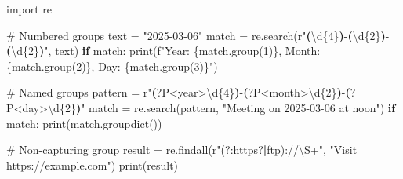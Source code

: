 \documentclass[
  english,
  letterpaper,
  DIV=11,
  numbers=noendperiod]{scrreprt}
\newenvironment{Shaded}{\begin{snugshade}}{\end{snugshade}}
\newcommand{\BuiltInTok}[1]{\textcolor[rgb]{0.00,0.23,0.31}{#1}}
\newcommand{\CommentTok}[1]{\textcolor[rgb]{0.37,0.37,0.37}{#1}}
\newcommand{\ControlFlowTok}[1]{\textcolor[rgb]{0.00,0.23,0.31}{\textbf{#1}}}
\newcommand{\DecValTok}[1]{\textcolor[rgb]{0.68,0.00,0.00}{#1}}
\newcommand{\FunctionTok}[1]{\textcolor[rgb]{0.28,0.35,0.67}{#1}}
\newcommand{\ImportTok}[1]{\textcolor[rgb]{0.00,0.46,0.62}{#1}}
\newcommand{\KeywordTok}[1]{\textcolor[rgb]{0.00,0.23,0.31}{\textbf{#1}}}
\newcommand{\NormalTok}[1]{\textcolor[rgb]{0.00,0.23,0.31}{#1}}
\newcommand{\OperatorTok}[1]{\textcolor[rgb]{0.37,0.37,0.37}{#1}}
\newcommand{\SpecialCharTok}[1]{\textcolor[rgb]{0.37,0.37,0.37}{#1}}
\newcommand{\SpecialStringTok}[1]{\textcolor[rgb]{0.13,0.47,0.30}{#1}}
\newcommand{\StringTok}[1]{\textcolor[rgb]{0.13,0.47,0.30}{#1}}
\newcommand{\VerbatimStringTok}[1]{\textcolor[rgb]{0.13,0.47,0.30}{#1}}
\begin{document}
\begin{Shaded}
\begin{Highlighting}[]
\ImportTok{import}\NormalTok{ re}

\CommentTok{\# Numbered groups}
\NormalTok{text }\OperatorTok{=} \StringTok{"2025{-}03{-}06"}
\NormalTok{match }\OperatorTok{=}\NormalTok{ re.search(}\VerbatimStringTok{r"}\KeywordTok{(}\DecValTok{\textbackslash{}d}\OperatorTok{\{4\}}\KeywordTok{)}\VerbatimStringTok{{-}}\KeywordTok{(}\DecValTok{\textbackslash{}d}\OperatorTok{\{2\}}\KeywordTok{)}\VerbatimStringTok{{-}}\KeywordTok{(}\DecValTok{\textbackslash{}d}\OperatorTok{\{2\}}\KeywordTok{)}\VerbatimStringTok{"}\NormalTok{, text)}
\ControlFlowTok{if}\NormalTok{ match:}
    \BuiltInTok{print}\NormalTok{(}\SpecialStringTok{f"Year: }\SpecialCharTok{\{}\NormalTok{match}\SpecialCharTok{.}\NormalTok{group(}\DecValTok{1}\NormalTok{)}\SpecialCharTok{\}}\SpecialStringTok{, Month: }\SpecialCharTok{\{}\NormalTok{match}\SpecialCharTok{.}\NormalTok{group(}\DecValTok{2}\NormalTok{)}\SpecialCharTok{\}}\SpecialStringTok{, Day: }\SpecialCharTok{\{}\NormalTok{match}\SpecialCharTok{.}\NormalTok{group(}\DecValTok{3}\NormalTok{)}\SpecialCharTok{\}}\SpecialStringTok{"}\NormalTok{)}

\CommentTok{\# Named groups}
\NormalTok{pattern }\OperatorTok{=} \VerbatimStringTok{r"}\KeywordTok{(}\FunctionTok{?P\textless{}year\textgreater{}}\DecValTok{\textbackslash{}d}\OperatorTok{\{4\}}\KeywordTok{)}\VerbatimStringTok{{-}}\KeywordTok{(}\FunctionTok{?P\textless{}month\textgreater{}}\DecValTok{\textbackslash{}d}\OperatorTok{\{2\}}\KeywordTok{)}\VerbatimStringTok{{-}}\KeywordTok{(}\FunctionTok{?P\textless{}day\textgreater{}}\DecValTok{\textbackslash{}d}\OperatorTok{\{2\}}\KeywordTok{)}\VerbatimStringTok{"}
\NormalTok{match }\OperatorTok{=}\NormalTok{ re.search(pattern, }\StringTok{"Meeting on 2025{-}03{-}06 at noon"}\NormalTok{)}
\ControlFlowTok{if}\NormalTok{ match:}
    \BuiltInTok{print}\NormalTok{(match.groupdict())}

\CommentTok{\# Non{-}capturing group}
\NormalTok{result }\OperatorTok{=}\NormalTok{ re.findall(}\VerbatimStringTok{r"}\NormalTok{(?:}\VerbatimStringTok{https}\OperatorTok{?}\ControlFlowTok{|}\VerbatimStringTok{ftp}\NormalTok{)}\VerbatimStringTok{://}\DecValTok{\textbackslash{}S}\OperatorTok{+}\VerbatimStringTok{"}\NormalTok{, }\StringTok{"Visit https://example.com"}\NormalTok{)}
\BuiltInTok{print}\NormalTok{(result)}
\end{Highlighting}
\end{Shaded}
\end{document}
